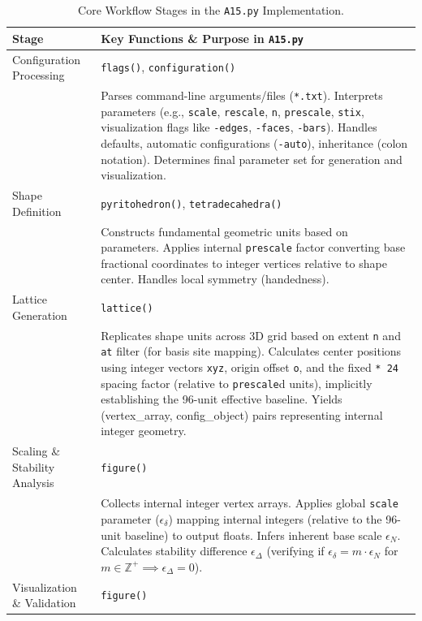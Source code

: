 \documentclass[10pt]{article}
\begin{document}
\begin{table}[!ht]
\centering
\caption{Core Workflow Stages in the \texttt{A15.py} Implementation.}
\label{tab:a15py-workflow}
\begin{tabularx}{\textwidth}{>{\raggedright\arraybackslash}p{} >{\raggedright\arraybackslash}X}
\toprule
\textbf{Stage} & \textbf{Key Functions \& Purpose in \texttt{A15.py}} \\
\midrule
Configuration Processing & \texttt{flags()}, \texttt{configuration()} \\
& Parses command-line arguments/files (\texttt{*.txt}). Interprets parameters (e.g., \texttt{scale}, \texttt{rescale}, \texttt{n}, \texttt{prescale}, \texttt{stix}, visualization flags like \texttt{-edges}, \texttt{-faces}, \texttt{-bars}). Handles defaults, automatic configurations (\texttt{-auto}), inheritance (colon notation). Determines final parameter set for generation and visualization. \\ \addlinespace
Shape Definition & \texttt{pyritohedron()}, \texttt{tetradecahedra()} \\
& Constructs fundamental geometric units based on parameters. Applies internal \texttt{prescale} factor converting base fractional coordinates to integer vertices relative to shape center. Handles local symmetry (handedness). \\ \addlinespace
Lattice Generation & \texttt{lattice()} \\
& Replicates shape units across 3D grid based on extent \texttt{n} and \texttt{at} filter (for basis site mapping). Calculates center positions using integer vectors \texttt{xyz}, origin offset \texttt{o}, and the fixed \texttt{* 24} spacing factor (relative to \texttt{prescale}d units), implicitly establishing the 96-unit effective baseline. Yields (vertex\_array, config\_object) pairs representing internal integer geometry. \\ \addlinespace
Scaling \& Stability Analysis & \texttt{figure()} \\
& Collects internal integer vertex arrays. Applies global \texttt{scale} parameter ($\epsilon_\delta$) mapping internal integers (relative to the 96-unit baseline) to output floats. Infers inherent base scale $\epsilon_N$. Calculates stability difference $\epsilon_\Delta$ (verifying if $\epsilon_\delta = m \cdot \epsilon_N$ for $m \in \mathbb{Z}^+ \implies \epsilon_\Delta=0$). \\ \addlinespace
Visualization \& Validation & \texttt{figure()} \\

\end{tabularx}
\end{table}
\end{document}
